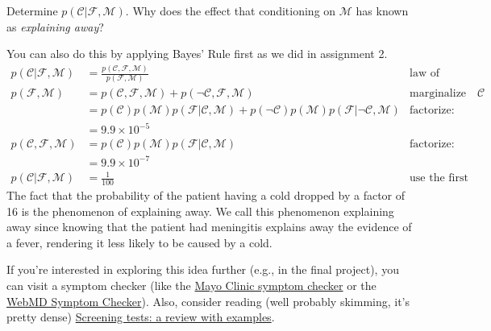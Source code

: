 \documentclass{tufte-handout}
\begin{document}
\begin{exercise}
\item Determine $p(\mathcal{C}|\mathcal{F}, \mathcal{M})$.  Why does the effect that conditioning on $\mathcal{M}$ has known as \emph{explaining away}?
\begin{boxedsolution}
You can also do this by applying Bayes' Rule first as we did in assignment 2.
\begin{align}
p(\mathcal{C}|\mathcal{F}, \mathcal{M}) &= \frac{p(\mathcal{C}, \mathcal{F}, \mathcal{M})}{p(\mathcal{F}, \mathcal{M})}& \mbox{law of conditional probability} \nonumber \\
p(\mathcal{F}, \mathcal{M}) &= p(\mathcal{C}, \mathcal{F}, \mathcal{M}) + p(\neg \mathcal{C}, \mathcal{F}, \mathcal{M})&\mbox{marginalize over $\mathcal{C}$} \nonumber \\
&= p(\mathcal{C}) p(\mathcal{M}) p(\mathcal{F}|\mathcal{C}, \mathcal{M}) + p(\neg \mathcal{C}) p(\mathcal{M}) p(\mathcal{F}|\neg\mathcal{C}, \mathcal{M}) & \mbox{factorize: children given parents}\nonumber \\
&= 9.9 \times 10^{-5} \nonumber \\
 p(\mathcal{C}, \mathcal{F}, \mathcal{M}) &= p(\mathcal{C}) p(\mathcal{M}) p(\mathcal{F}|\mathcal{C}, \mathcal{M})  & \mbox{factorize: children given parents}\nonumber \\
 &= 9.9 \times 10^{-7} \nonumber \\
 p(\mathcal{C}|\mathcal{F}, \mathcal{M}) &= \frac{1}{100} &\mbox{use the first equation in this box} \nonumber
\end{align}
The fact that the probability of the patient having a cold dropped by a factor of 16 is the phenomenon of explaining away.  We call this phenomenon explaining away since knowing that the patient had meningitis explains away the evidence of a fever, rendering it less likely to be caused by a cold.

\end{boxedsolution}
\ees

\noindent If you're interested in exploring this idea further (e.g., in the final project), you can visit a symptom checker (like the \href{https://www.mayoclinic.org/symptom-checker/select-symptom/itt-20009075}{Mayo Clinic symptom checker} or the \href{https://symptoms.webmd.com/default.htm\#/info}{WebMD Symptom Checker}).  Also, consider reading (well probably skimming, it's pretty dense) \href{https://www.ncbi.nlm.nih.gov/pmc/articles/PMC4389712/}{Screening tests: a review with examples}.

\end{exercise}
\end{document}
